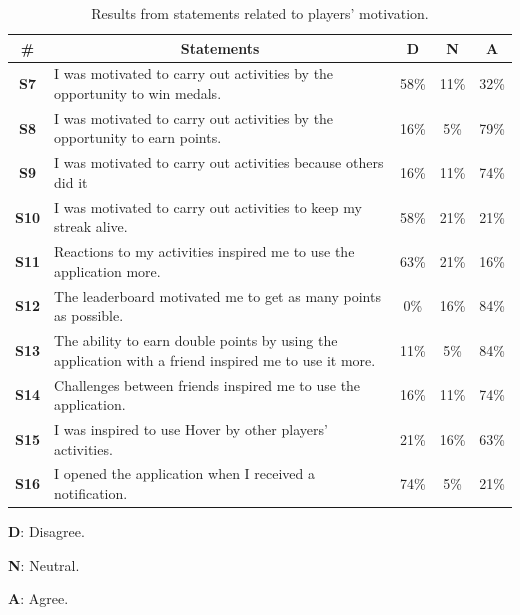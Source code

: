 \begin{table}[H]
    \begin{threeparttable}[h]
    \small
    \begin{tabularx}{\textwidth}{|c|X|c|c|c|}
        \hline
        \multicolumn{1}{|c|}{\textbf{\#}} &
        \multicolumn{1}{c|}{\textbf{Statements}}  & 
        \multicolumn{1}{c|}{\textbf{D}} & 
        \multicolumn{1}{c|}{\textbf{N}}  & 
        \multicolumn{1}{c|}{\textbf{A}} \\ \hline
        \textbf{S7} & I was motivated to carry out activities by the opportunity to win medals. & 58\% & 11\% & 32\% \\
        \textbf{S8} & I was motivated to carry out activities by the opportunity to earn points. & 16\% & 5\% & 79\% \\
        \textbf{S9} & I was motivated to carry out activities because others did it & 16\% & 11\% & 74\%  \\
        \textbf{S10} & I was motivated to carry out activities to keep my streak alive. & 58\% & 21\% & 21\%  \\
        \textbf{S11} & Reactions to my activities inspired me to use the application more. & 63\% & 21\% & 16\%  \\
        \textbf{S12} & The leaderboard motivated me to get as many points as possible. & 0\% & 16\% & 84\%  \\
        \textbf{S13} & The ability to earn double points by using the application with a friend inspired me to use it more. & 11\% & 5\% & 84\% \\
        \textbf{S14} & Challenges between friends inspired me to use the application. & 16\% & 11\% & 74\%  \\
        \textbf{S15} & I was inspired to use Hover by other players' activities. & 21\% & 16\% & 63\% \\
        \textbf{S16} & I opened the application when I received a notification. & 74\% & 5\% & 21\% \\
        \hline
    \end{tabularx}
    \begin{tablenotes}
    \scriptsize
     \item[] \textbf{D}: Disagree.
     \item[] \textbf{N}: Neutral.
     \item[] \textbf{A}: Agree.
  \end{tablenotes}
  \end{threeparttable}
    \caption{Results from statements related to players’ motivation.}
    \label{tab:motivation_statements}
    \vspace*{-\baselineskip}
\end{table}


